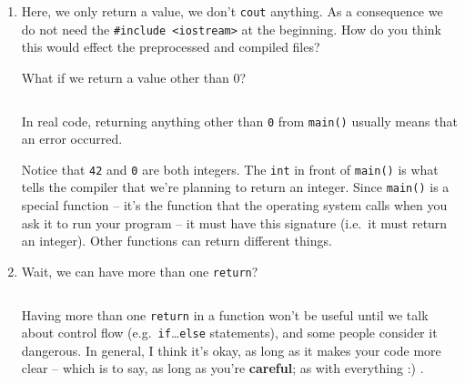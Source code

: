 \documentclass[12pt,letterpaper]{article}
\begin{document}
\begin{enumerate}
  \filbreak \item
    Here, we only return a value, we don't \texttt{cout} anything.  As
    a consequence we do not need the \texttt{#include <iostream>} at
    the beginning.  How do you think this would effect the preprocessed and
    compiled files?

    What if we return a value other than 0?

    \inputminted{cpp}{hello-world-05.cpp}

    In real code, returning anything other than \texttt{0} from
    \texttt{main()} usually means that an error occurred.

    Notice that \texttt{42} and \texttt{0} are both integers.
    The \texttt{int} in front of \texttt{main()} is what
    tells the compiler that we're planning to return an integer.  Since
    \texttt{main()} is a special function -- it's the function that
    the operating system calls when you ask it to run your program -- it must
    have this signature (i.e.~it must return an integer).  Other functions can
    return different things.


% 


  \filbreak \item
    Wait, we can have more than one \texttt{return}?

    \inputminted{cpp}{hello-world-07.cpp}

    Having more than one \texttt{return} in a function won't be useful
    until we talk about control flow
    (e.g.~\texttt{if}\ldots\texttt{else} statements), and
    some people consider it dangerous.  In general, I think it's okay, as long
    as it makes your code more clear -- which is to say, as long as you're
    \textbf{careful}; as with everything :) .


% 
% 


%     

\end{enumerate}
\end{document}
